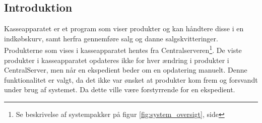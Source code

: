 \subsection{Introduktion}
Kasseapparatet er et program som viser produkter og kan håndtere disse i en indkøbskurv, samt herfra gennemføre salg og danne salgskvitteringer. Produkterne som vises i kasseapparatet hentes fra Centralserveren\footnote{Se beskrivelse af systempakker på figur \ref{fig:system_oversigt}, side \pageref{fig:system_oversigt}}. De viste produkter i kasseapparatet opdateres ikke for hver ændring i produkter i CentralServer, men når en ekspedient beder om en opdatering manuelt. Denne funktionalitet er valgt, da det ikke var ønsket at produkter kom frem og forsvandt under brug af systemet. Da dette ville være forstyrrende for en ekspedient.


